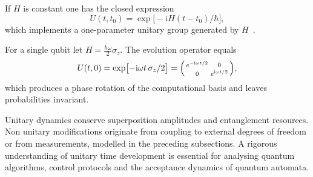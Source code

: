 \begin{remark}
	If $H$ is constant one has the closed expression
	\[
		U(t,t_{0}) = \exp\bigl[-\mathrm iH(t-t_{0})/\hbar\bigr] ,
	\]
	which implements a one-parameter unitary group generated by $H$~\cite{Sakurai1994}.
\end{remark}

\begin{example}\label{ex:qubit_rotation}
	For a single qubit let $H=\tfrac{\hbar\omega}{2}\sigma_{z}$.  
	The evolution operator equals
	\[
		U(t,0)=\exp\bigl[-\mathrm i\omega t\,\sigma_{z}/2\bigr]
		=\begin{psmallmatrix}
			 e^{-\mathrm i\omega t/2} & 0 \\[2pt]
			 0 & e^{\mathrm i\omega t/2}
		  \end{psmallmatrix},
	\]
	which produces a phase rotation of the computational basis and leaves probabilities invariant.
\end{example}


Unitary dynamics conserve superposition amplitudes and entanglement resources.  
Non unitary modifications originate from coupling to external degrees of freedom or from measurements, modelled in the preceding subsections.  
A rigorous understanding of unitary time development is essential for analysing quantum algorithms, control protocols and the acceptance dynamics of quantum automata.
